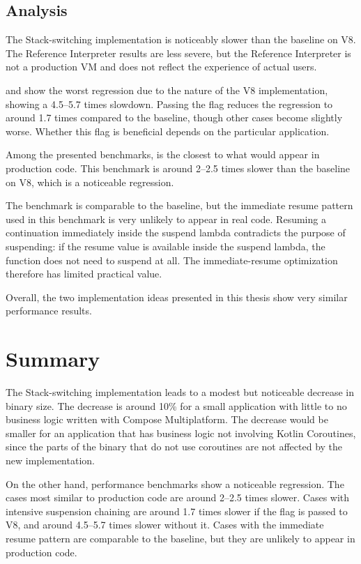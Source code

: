 \subsection{Analysis}

The Stack-switching implementation is noticeably slower than the baseline on V8. The Reference Interpreter
results are less severe, but the Reference Interpreter is not a production VM and does not reflect the
experience of actual users.

 and  show the worst regression due to the nature of the V8
implementation, showing a 4.5--5.7 times slowdown. Passing the
 flag reduces the regression to around 1.7 times
compared to the baseline, though other cases become slightly worse. Whether this flag is beneficial
depends on the particular application.

Among the presented benchmarks,  is the closest to
what would appear in production code. This benchmark
is around 2--2.5 times slower than the baseline on V8, which is a noticeable regression.

The  benchmark is comparable to the baseline, but the immediate resume pattern used in
this benchmark is very unlikely to appear in real code. Resuming a continuation immediately inside the
suspend lambda contradicts the purpose of suspending: if the resume value is available inside the
suspend lambda, the function does not need to suspend at all. The immediate-resume optimization therefore
has limited practical value.

Overall, the two implementation ideas presented in this thesis show very similar performance results.

\section{Summary}
\label{sec:evaluation-summary}

The Stack-switching implementation leads to a modest but noticeable decrease in binary size. The decrease is around 10\%
for a small application with little to no business logic written with Compose Multiplatform. The decrease would be
smaller for an application that has business logic not involving Kotlin Coroutines, since the parts of the
binary that do not use coroutines are not affected by the new implementation.

On the other hand,
performance benchmarks show a noticeable regression. The cases most similar to production code
are around 2--2.5 times slower. Cases with intensive suspension chaining are around 1.7 times slower if the
 flag is passed to V8, and around 4.5--5.7 times slower without it. Cases with the
immediate resume pattern are comparable to the baseline, but they are unlikely to appear in production code.

